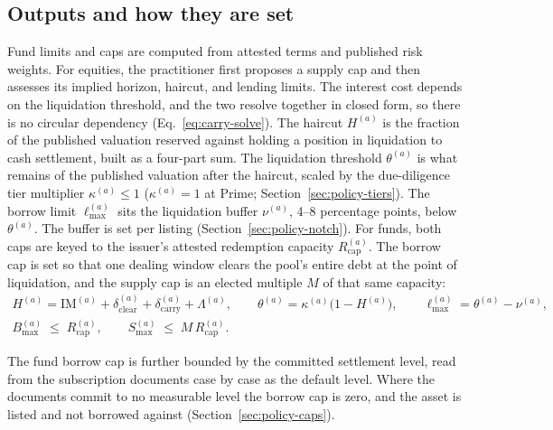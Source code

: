 \subsection{Outputs and how they are set}\label{sec:overview-recipe}
Fund limits and caps are computed from attested terms and published risk weights. For equities, the practitioner first proposes a supply cap and then assesses its implied horizon, haircut, and lending limits. The interest cost depends on the liquidation threshold, and the two resolve together in closed form, so there is no circular dependency (Eq.~\eqref{eq:carry-solve}). The haircut $H^{(a)}$ is the fraction of the published valuation reserved against holding a position in liquidation to cash settlement, built as a four-part sum. The liquidation threshold $\theta^{(a)}$ is what remains of the published valuation after the haircut, scaled by the due-diligence tier multiplier $\kappa^{(a)}\le 1$ ($\kappa^{(a)}=1$ at Prime; Section~\ref{sec:policy-tiers}). The borrow limit $\ell_{\max}^{(a)}$ sits the liquidation buffer $\nu^{(a)}$, 4--8 percentage points, below $\theta^{(a)}$. The buffer is set per listing (Section~\ref{sec:policy-notch}). For funds, both caps are keyed to the issuer's attested redemption capacity $R_{\mathrm{cap}}^{(a)}$. The borrow cap is set so that one dealing window clears the pool's entire debt at the point of liquidation, and the supply cap is an elected multiple $M$ of that same capacity:
\begin{gather*}
H^{(a)} = \mathrm{IM}^{(a)} + \delta_{\mathrm{clear}}^{(a)} + \delta_{\mathrm{carry}}^{(a)} + \Lambda^{(a)},\qquad
\theta^{(a)} = \kappa^{(a)}\bigl(1 - H^{(a)}\bigr),\qquad
\ell_{\max}^{(a)} = \theta^{(a)} - \nu^{(a)},\\
B_{\max}^{(a)} \;\le\; R_{\mathrm{cap}}^{(a)},\qquad
S_{\max}^{(a)} \;\le\; M\,R_{\mathrm{cap}}^{(a)}.
\end{gather*}

The fund borrow cap is further bounded by the committed settlement level, read from the subscription documents case by case as the default level. Where the documents commit to no measurable level the borrow cap is zero, and the asset is listed and not borrowed against (Section~\ref{sec:policy-caps}).

